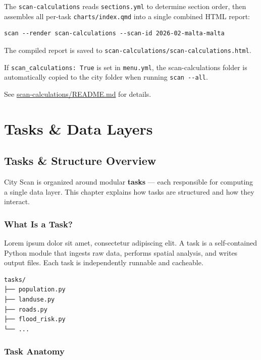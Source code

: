 \documentclass[
  letterpaper,
  DIV=11,
  numbers=noendperiod]{scrreprt}
\begin{document}
The \texttt{scan-calculations} reads \texttt{sections.yml} to determine
section order, then assembles all per-task \texttt{charts/index.qmd}
into a single combined HTML report:

\begin{verbatim}
scan --render scan-calculations --scan-id 2026-02-malta-malta
\end{verbatim}

The compiled report is saved to
\texttt{scan-calculations/scan-calculations.html}.

If \texttt{scan\_calculations:\ True} is set in \texttt{menu.yml}, the
scan-calculations folder is automatically copied to the city folder when
running \texttt{scan\ -\/-all}.

See
\href{../../scan-calculations/README.md}{scan-calculations/README.md}
for details.

\part{Tasks \& Data Layers}

\chapter{Tasks \& Structure Overview}\label{tasks-structure-overview}

City Scan is organized around modular \textbf{tasks} --- each
responsible for computing a single data layer. This chapter explains how
tasks are structured and how they interact.

\section{What Is a Task?}\label{what-is-a-task}

Lorem ipsum dolor sit amet, consectetur adipiscing elit. A task is a
self-contained Python module that ingests raw data, performs spatial
analysis, and writes output files. Each task is independently runnable
and cacheable.

\begin{verbatim}
tasks/
├── population.py
├── landuse.py
├── roads.py
├── flood_risk.py
└── ...
\end{verbatim}

\section{Task Anatomy}\label{task-anatomy}
\end{document}
